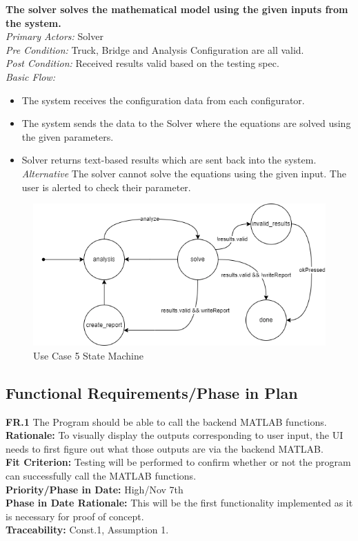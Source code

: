 \documentclass[12pt]{article}
\begin{document}
\noindent
\textbf{The solver solves the mathematical model using the given inputs from the system.} \\
\emph{  Primary Actors:} Solver\\
\emph{  Pre Condition:} Truck, Bridge and Analysis Configuration are all valid.\\
\emph{  Post Condition:} Received results valid based on the testing spec.\\ 
\emph{  Basic Flow:} 
\begin{itemize}
\item The system receives the configuration data from each configurator. 
\item The system sends the data to the Solver where the equations are solved using the given parameters. 
\item Solver returns text-based results which are sent back into the system. 
\subitem \emph{Alternative} The solver cannot solve the equations using the given input. The user is alerted to check their parameter. 
\end{itemize}
\begin{figure}[H]
  \centering
  \includegraphics[width=0.5\linewidth]{use-case-5-sm.png}
  \caption{Use Case 5 State Machine}
  \label {fig:use-case-5-sm}
\end{figure}

\subsection{Functional Requirements/Phase in Plan}
  \textbf{FR.1} The Program should be able to call the backend MATLAB functions. \\
  \textbf{Rationale:} To visually display the outputs corresponding to user input, the UI needs to first figure out what those outputs are via the backend MATLAB.\\
  \textbf{Fit Criterion:} Testing will be performed to confirm whether or not the program can successfully call the MATLAB functions.\\
  \textbf{Priority/Phase in Date:} High/Nov 7th\\
  \textbf{Phase in Date Rationale:} This will be the first functionality implemented as it is necessary for proof of concept.\\
  \textbf{Traceability:} Const.1, Assumption 1.\\\\
  
\end{document}
